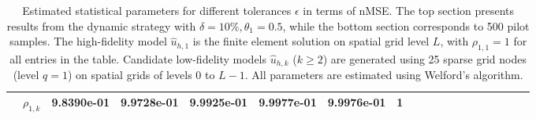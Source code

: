 \begin{table}[ht]
{\begin{tabular}{|c|c|c|c|c|c|c|c|c|c|c|c|c|c|c|c|c|c|c|}
\cline{2-8}	
&\multicolumn{1}{|c|}{$\rho_{1,k}$}&9.8390e-01   &9.9728e-01   &9.9925e-01   &9.9977e-01   &9.9976e-01   &1\\
\hline
\end{tabular}}
\caption{Estimated statistical parameters for different tolerances $\epsilon$ in terms of nMSE. The top section presents results from the dynamic strategy with $\delta=10\%, \theta_1=0.5$, while the bottom section corresponds to 500 pilot samples. The high-fidelity model $\widehat u_{h,1}$ is the finite element solution on spatial grid level $L$, with $\rho_{1,1}=1$ for all entries in the table. Candidate low-fidelity models $\widehat u_{h,k}$ ($k \geq 2$) are generated using 25 sparse grid nodes (level $q=1$) on spatial grids of levels 0 to $L-1$. All parameters are estimated using Welford's algorithm.}
\label{Tab:MFMC_parameters}
\end{table}
%






